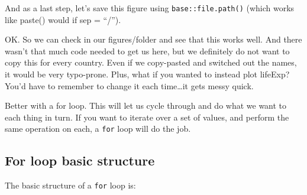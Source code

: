\documentclass[]{book}
\newenvironment{Shaded}{\begin{snugshade}}{\end{snugshade}}
\newcommand{\KeywordTok}[1]{\textcolor[rgb]{0.13,0.29,0.53}{\textbf{#1}}}
\newcommand{\DataTypeTok}[1]{\textcolor[rgb]{0.13,0.29,0.53}{#1}}
\newcommand{\DecValTok}[1]{\textcolor[rgb]{0.00,0.00,0.81}{#1}}
\newcommand{\StringTok}[1]{\textcolor[rgb]{0.31,0.60,0.02}{#1}}
\newcommand{\OperatorTok}[1]{\textcolor[rgb]{0.81,0.36,0.00}{\textbf{#1}}}
\newcommand{\NormalTok}[1]{#1}
\theoremstyle{definition}
\theoremstyle{definition}
\theoremstyle{definition}
\theoremstyle{remark}
\begin{document}
And as a last step, let's save this figure using
\texttt{base::file.path()} (which works like paste() would if sep =
``/'').

\begin{Shaded}
\end{Shaded}

OK. So we can check in our figures/folder and see that this works well.
And there wasn't that much code needed to get us here, but we definitely
do not want to copy this for every country. Even if we copy-pasted and
switched out the names, it would be very typo-prone. Plus, what if you
wanted to instead plot lifeExp? You'd have to remember to change it each
time\ldots{}it gets messy quick.

Better with a for loop. This will let us cycle through and do what we
want to each thing in turn. If you want to iterate over a set of values,
and perform the same operation on each, a \texttt{for} loop will do the
job.

\subsection{For loop basic structure}\label{for-loop-basic-structure}

The basic structure of a \texttt{for} loop is:
\end{document}
